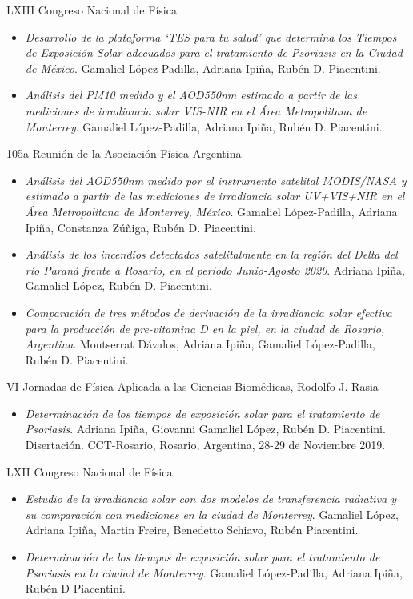 \documentclass[12pt,letterpaper]{article}
\begin{document}
LXIII Congreso Nacional de Física
\begin{itemize}[label={}]
    \item \textit{Desarrollo de la plataforma ‘TES para tu salud’  que determina los Tiempos de Exposición Solar adecuados para el tratamiento de Psoriasis en la Ciudad de México}. Gamaliel López-Padilla, Adriana Ipiña, Rubén D. Piacentini.
    \item \textit{Análisis del PM10 medido y el AOD550nm estimado a partir de las mediciones de irradiancia solar VIS-NIR en el Área Metropolitana de Monterrey}. Gamaliel López-Padilla, Adriana Ipiña, Rubén D. Piacentini.
\end{itemize}

105a Reunión de la Asociación Física Argentina
\begin{itemize}[label={}]
    \item \textit{Análisis del AOD550nm medido por el instrumento satelital MODIS/NASA y estimado a partir de las mediciones de irradiancia solar UV+VIS+NIR en el Área Metropolitana de Monterrey, México}. Gamaliel López-Padilla, Adriana Ipiña, Constanza Zúñiga, Rubén D. Piacentini.
    \item \textit{Análisis de los incendios detectados satelitalmente en la región del Delta del río Paraná frente a Rosario, en el periodo Junio-Agosto 2020}. Adriana Ipiña, Gamaliel López, Rubén D. Piacentini.
    \item \textit{Comparación de tres métodos de derivación de la irradiancia solar efectiva para la producción de pre-vitamina D en la piel, en la ciudad de Rosario, Argentina}. Montserrat Dávalos, Adriana Ipiña, Gamaliel López-Padilla, Rubén D. Piacentini.
\end{itemize}

VI Jornadas de Física Aplicada a las Ciencias Biomédicas, Rodolfo J. Rasia
\begin{itemize}[label={}]
    \item \textit{Determinación de los tiempos de exposición solar para el tratamiento de Psoriasis}. Adriana Ipiña, Giovanni Gamaliel López, Rubén D. Piacentini. Disertación. CCT-Rosario, Rosario, Argentina, 28-29 de Noviembre 2019.
\end{itemize}

LXII Congreso Nacional de Física
\begin{itemize}[label={}]
    \item \textit{Estudio de la irradiancia solar con dos modelos de transferencia radiativa y su comparación con mediciones en la ciudad de Monterrey}. Gamaliel López, Adriana Ipiña, Martin Freire, Benedetto Schiavo, Rubén Piacentini.
    \item \textit{Determinación de los tiempos de exposición solar para el tratamiento de Psoriasis en la ciudad de Monterrey}. Gamaliel López-Padilla, Adriana Ipiña, Rubén D Piacentini.
\end{itemize}
\end{document}

